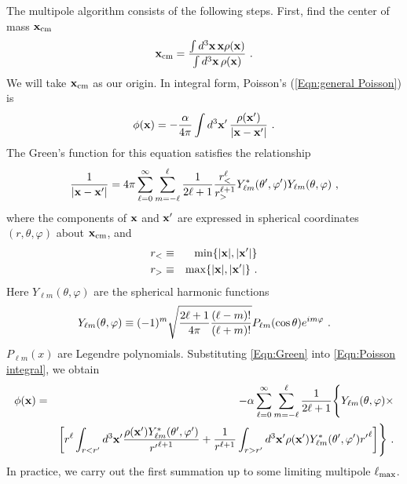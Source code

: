 The multipole algorithm consists of the following steps.
First, find the center of mass ${\bf x}_{\rm cm}$
\begin{equation}
{\bf x}_{\rm cm} = {\int d^3{\bf x}\,{\bf x}\rho({\bf x}) \over
                    \int d^3{\bf x}\,\rho({\bf x})}\ .
\end{equation}
We will take ${\bf x}_{\rm cm}$ as our origin.  In integral form, Poisson's
(\eqref{Eqn:general Poisson}) is
\begin{equation}
\label{Eqn:Poisson integral}
\phi({\bf x}) = -{\alpha\over 4\pi}\int d^3{\bf x}'\,{\rho({\bf x}')\over
                |{\bf x} - {\bf x}'|}\ .
\end{equation}
The Green's function for this equation satisfies the relationship
\begin{equation}
\label{Eqn:Green}
{1\over |{\bf x} - {\bf x}'|} =
  4\pi\sum_{\ell=0}^\infty \sum_{m=-\ell}^\ell {1\over 2\ell+1}
  {r_<^\ell\over r_>^{\ell+1}}
  Y_{\ell m}^*(\theta',\varphi') Y_{\ell m}(\theta,\varphi)\ ,
\end{equation}
where the components of ${\bf x}$ and ${\bf x}'$ are expressed in
spherical coordinates $(r,\theta,\varphi)$ about ${\bf x}_{\rm cm}$, and
\begin{eqnarray}
r_< &\equiv& \min\{ |{\bf x}|, |{\bf x}'| \} \\
\nonumber
r_> &\equiv& \max\{ |{\bf x}|, |{\bf x}'| \}\ .
\end{eqnarray}
Here $Y_{\ell m}(\theta,\varphi)$ are the spherical harmonic functions
\begin{equation}
Y_{\ell m}(\theta,\varphi) \equiv
  (-1)^m \sqrt{ {2\ell+1\over 4\pi} {(\ell-m)!\over (\ell+m)!} }
  P_{\ell m}(\cos\theta) e^{im\varphi}\ .
\end{equation}
$P_{\ell m}(x)$ are Legendre polynomials.
Substituting \eqref{Eqn:Green} into
\eqref{Eqn:Poisson integral}, we obtain
\begin{eqnarray}
\label{Eqn:Multipole_poisint2}
\phi({\bf x}) &=& -\alpha
  \sum_{\ell=0}^\infty \sum_{m=-\ell}^\ell {1\over 2\ell+1}
  \Biggl\{
  Y_{\ell m}(\theta,\varphi) \times \\
\nonumber
  &&
  \left[ r^\ell \int_{r<r'} d^3{\bf x}' {\rho({\bf x}')
                   Y_{\ell m}^*(\theta',\varphi')\over {r'}^{\ell+1}} +
         {1\over r^{\ell+1}} \int_{r>r'} d^3{\bf x}' \rho({\bf x}')
                   Y_{\ell m}^*(\theta',\varphi') {r'}^\ell \right]\Biggr\} \ .
\end{eqnarray}
In practice, we carry out the first summation
up to some limiting multipole $\ell_{\rm max}$.
